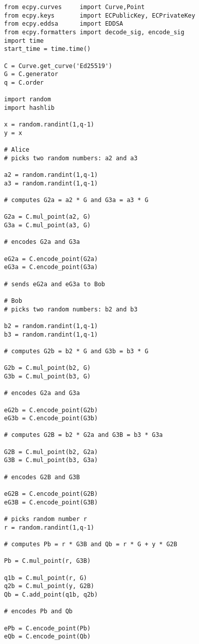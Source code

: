 \begin{lstlisting}
from ecpy.curves     import Curve,Point
from ecpy.keys       import ECPublicKey, ECPrivateKey
from ecpy.eddsa      import EDDSA
from ecpy.formatters import decode_sig, encode_sig
import time
start_time = time.time()

C = Curve.get_curve('Ed25519')
G = C.generator
q = C.order

import random
import hashlib

x = random.randint(1,q-1)
y = x

# Alice 
# picks two random numbers: a2 and a3 

a2 = random.randint(1,q-1)
a3 = random.randint(1,q-1)

# computes G2a = a2 * G and G3a = a3 * G 

G2a = C.mul_point(a2, G) 
G3a = C.mul_point(a3, G)

# encodes G2a and G3a

eG2a = C.encode_point(G2a) 
eG3a = C.encode_point(G3a)

# sends eG2a and eG3a to Bob

# Bob 
# picks two random numbers: b2 and b3 

b2 = random.randint(1,q-1)
b3 = random.randint(1,q-1)

# computes G2b = b2 * G and G3b = b3 * G 

G2b = C.mul_point(b2, G)
G3b = C.mul_point(b3, G)

# encodes G2a and G3a

eG2b = C.encode_point(G2b) 
eG3b = C.encode_point(G3b)

# computes G2B = b2 * G2a and G3B = b3 * G3a 

G2B = C.mul_point(b2, G2a) 
G3B = C.mul_point(b3, G3a)

# encodes G2B and G3B

eG2B = C.encode_point(G2B) 
eG3B = C.encode_point(G3B)

# picks random number r 
r = random.randint(1,q-1)

# computes Pb = r * G3B and Qb = r * G + y * G2B

Pb = C.mul_point(r, G3B)

q1b = C.mul_point(r, G)
q2b = C.mul_point(y, G2B)
Qb = C.add_point(q1b, q2b)

# encodes Pb and Qb

ePb = C.encode_point(Pb) 
eQb = C.encode_point(Qb)


\end{lstlisting}
